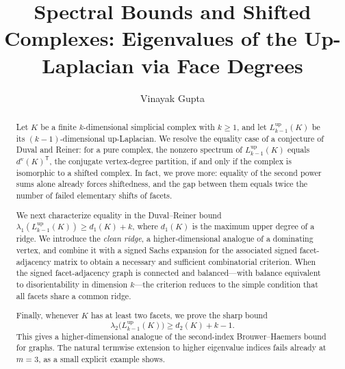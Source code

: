 \documentclass[11pt,reqno]{amsart}
\numberwithin{equation}{section}
\theoremstyle{plain}
\theoremstyle{definition}
\newcommand{\Lup}{L^{\mathrm{up}}}
\newcommand{\T}{\mathsf{T}}
\begin{document}
\title[Spectral bounds and shifted complexes]
{Spectral Bounds and Shifted Complexes: Eigenvalues of the Up-Laplacian via Face Degrees}

\author{Vinayak Gupta}
\address{Vinayak Gupta\\
Department of Mathematics, Indian Institute of Technology Guwahati,
Guwahati 781039, India}


\begin{abstract}
Let $K$ be a finite $k$-dimensional simplicial complex with $k\ge1$, and let
$\Lup_{k-1}(K)$ be its $(k-1)$-dimensional up-Laplacian. We resolve the
equality case of a conjecture of Duval and Reiner: for a pure complex, the nonzero spectrum of
$\Lup_{k-1}(K)$ equals ${d^{\mathrm v}(K)}^{\T}$, the conjugate vertex-degree partition, if and
only if the complex is isomorphic to a shifted complex. In fact, we prove more: equality of the
second power sums alone already forces shiftedness, and the gap between them equals twice the
number of failed elementary shifts of facets.

We next characterize equality in the Duval--Reiner bound
$\lambda_1(\Lup_{k-1}(K))\ge d_1(K)+k$, where $d_1(K)$ is the maximum upper degree of a ridge.
We introduce the \emph{clean ridge}, a higher-dimensional analogue of a dominating vertex, and
combine it with a signed Sachs expansion for the associated signed facet-adjacency matrix to
obtain a necessary and sufficient combinatorial criterion. When the signed facet-adjacency
graph is connected and balanced---with balance equivalent to disorientability in dimension
$k$---the criterion reduces to the simple condition that all facets share a common ridge.

Finally, whenever $K$ has at least two facets, we prove the sharp bound
\[
  \lambda_2\bigl(\Lup_{k-1}(K)\bigr)\ge d_2(K)+k-1.
\]
This gives a higher-dimensional analogue of the second-index Brouwer--Haemers bound for graphs.
The natural termwise extension to higher eigenvalue indices fails already at $m=3$, as a small
explicit example shows.
\end{abstract}

\maketitle
\end{document}
